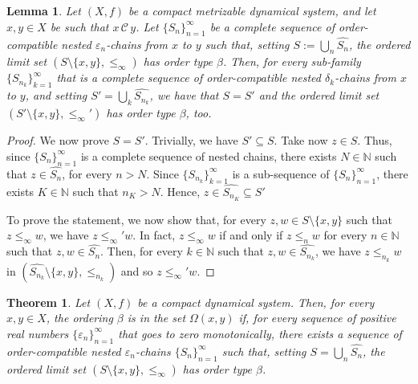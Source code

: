 \documentclass[10pt,a4paper]{article}
\theoremstyle{definition}
\theoremstyle{remark}
\theoremstyle{plain}
\newtheorem{lem}[defi]{Lemma}
\newtheorem{thm}[defi]{Theorem}
\begin{document}
\begin{lem}\label{lem:subsequence}
    Let $(X,f)$ be a compact metrizable dynamical system, and let $x,y\in X$ be such that $x\,\mathcal{C}\,y$. Let $\{S_n\}_{n=1}^{\infty}$ be a complete sequence of order-compatible nested  $\varepsilon_n$-chains from $x$ to $y$ such that, setting $S:=\bigcup_n \widehat{S_n}$, the ordered limit set $(S\setminus\{x,y\},\leq_\infty)$ has order type $\beta$. Then, for every sub-family $\{S_{n_k}\}_{k=1}^{\infty}$ that is a complete sequence of order-compatible nested $\delta_k$-chains from $x$ to $y$, and setting $S'=\bigcup_k\widehat{S_{n_k}}$, we have that $S=S'$ and the ordered limit set $(S'\setminus\{x,y\},\le_\infty')$ has order type $\beta$, too.
\end{lem}
\begin{proof}
    We now prove $S=S'$. Trivially, we have $S'\subseteq S$. Take now $z\in S$. Thus, since $\{S_n\}_{n=1}^{\infty}$ is a complete sequence of nested chains, there exists $N\in\mathbb N$ such that $z\in\widehat{S_n}$, for every $n>N$. Since $\{S_{n_k}\}_{k=1}^{\infty}$ is a sub-sequence of $\{S_n\}_{n=1}^{\infty}$, there exists $K\in\mathbb N$ such that $n_K>N$. Hence, $z\in\widehat{S_{n_K}}\subseteq S'$       
    
    To prove the statement, we now show that, for every $z,w\in S\setminus\{x,y\}$ such that $z\le_\infty w$, we have $z\le_\infty'w$. In fact, $z\le_\infty w$ if and only if $z\leq_n w$ for every $n\in\mathbb N$ such that $z,w\in\widehat{S_n}$. Then, for every $k\in\mathbb{N}$ such that $z,w\in\widehat{S_{n_k}}$, we have $z\leq_{n_k} w$ in $(\widehat{S_{n_k}}\setminus\{x,y\},\leq_{n_k})$ and so $z\leq_\infty' w$.
\end{proof}

\begin{thm}\label{cor:sequence-indipendence}
    Let $(X,f)$ be a compact dynamical system. Then, for every $x,y\in X$, the ordering $\beta$ is in the set $\Omega(x,y)$ if, for every sequence of positive real numbers $\{\varepsilon_n\}_{n=1}^{\infty}$ that goes to zero monotonically, there exists a sequence of order-compatible nested $\varepsilon_n$-chains $\{S_n\}_{n=1}^{\infty}$ such that, setting $S=\bigcup_n\widehat{S_n}$, the ordered limit set $(S\setminus\{x,y\},\le_\infty)$ has order type $\beta$.
\end{thm}
\end{document}
